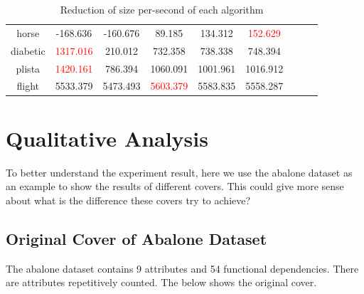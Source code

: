\documentclass[11pt]{book}
\begin{document}
\begin{table}
\begin{tabular}{|c|c|c|c|c|c|c|c|c|}
horse & -168.636 & -160.676 & 89.185 & 134.312 & \textcolor{red}{152.629} && \\                                                                                                                                                          
diabetic & \textcolor{red}{1317.016} & 210.012 & 732.358 & 738.338 & 748.394 && \\                                                                                                                                                       
plista & \textcolor{red}{1420.161} & 786.394 & 1060.091 & 1001.961 & 1016.912 && \\                                                                                                                                                      
flight & 5533.379 & 5473.493 & \textcolor{red}{5603.379} & 5583.835 & 5558.287 && \\	

    \hline
        
\end{tabular}

	\caption{Reduction of size per-second of each algorithm}

\end{table}

\section{Qualitative Analysis}

To better understand the experiment result, here we use the abalone dataset as an example to show the results of different covers. This could give more sense about what is the difference these covers try to achieve?

\subsection{Original Cover of Abalone Dataset}

The abalone dataset contains 9 attributes and 54 functional dependencies. There are attributes repetitively counted. The below shows the original cover.
\end{document}
